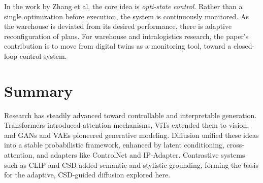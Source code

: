 In the work by Zhang et al, \cite{Zhang2026} the core idea is \emph{opti-state control}. Rather than a single optimization before execution, the system is continuously monitored.
 As the warehouse is deviated from its desired performance, there is adaptive reconfiguration of plans.  For warehouse and intralogistics research, the paper's contribution is to 
 move from digital twins as a monitoring tool, toward a closed-loop control system.

\section*{Summary}

Research has steadily advanced toward controllable and interpretable generation.  
Transformers introduced attention mechanisms, ViTs extended them to vision, and GANs and VAEs pioneered generative modeling.  
Diffusion unified these ideas into a stable probabilistic framework, enhanced by latent conditioning, cross-attention, and adapters like ControlNet and IP-Adapter.  
Contrastive systems such as CLIP and CSD added semantic and stylistic grounding, forming the basis for the adaptive, CSD-guided diffusion explored here.
